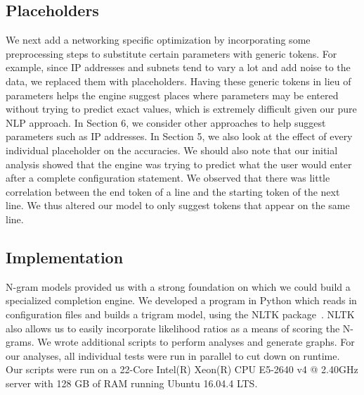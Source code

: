 \subsection{Placeholders}
We next add a networking specific optimization by incorporating some preprocessing steps to substitute certain parameters with generic tokens. For example, since IP addresses and subnets tend to vary a lot and add noise to the data, we replaced them with placeholders. Having these generic tokens in lieu of parameters helps the engine suggest places where parameters may be entered without trying to predict exact values, which is extremely difficult given our pure NLP approach. In Section 6, we consider other approaches to help suggest parameters such as IP addresses. In Section 5, we also look at the effect of every individual placeholder on the accuracies. We should also note that our initial analysis showed that the engine was trying to predict what the user would enter after a complete configuration statement. We observed that there was little correlation between the end token of a line and the starting token of the next line. We thus altered our model to only suggest tokens that appear on the same line.\\

\subsection{Implementation}

N-gram models provided us with a strong foundation on which we could build a specialized completion engine. We developed a program in Python which reads in configuration files and builds a trigram model, using the NLTK package~\cite{nltk}. NLTK also allows us to easily incorporate likelihood ratios as a means of scoring the N-grams. We wrote additional scripts to perform analyses and generate graphs. For our analyses, all individual tests were run in parallel to cut down on runtime. Our scripts were run on a 22-Core Intel(R) Xeon(R) CPU E5-2640 v4 @ 2.40GHz server with 128 GB of RAM running Ubuntu 16.04.4 LTS.\\ 



